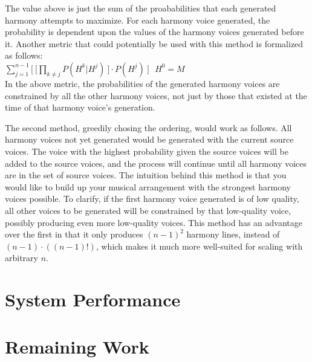 \documentclass{sig-alternate}
\begin{document}
The value above is just the sum of the proababilities that each generated harmony attempts to maximize. For each harmony voice generated, the probability is dependent upon the values of the harmony voices generated before it. Another metric that could potentially be used with this method is formalized as follows: \\

$\sum_{j = 1}^{n - 1} \lbrack\ \lbrack\prod_{k \neq j} P(H^{k} | H^{j})\ \rbrack \cdot P(H^{j})\ \rbrack\ \ \ H^{0} = M$\\

In the above metric, the probabilities of the generated harmony voices are constrained by all the other harmony voices, not just by those that existed at the time of that harmony voice's generation. 

The second method, greedily chosing the ordering, would work as follows. All harmony voices not yet generated would be generated with the current source voices. The voice with the highest probability given the source voices will be added to the source voices, and the process will continue until all harmony voices are in the set of source voices. The intuition behind this method is that you would like to build up your musical arrangement with the strongest harmony voices possible. To clarify, if the first harmony voice generated is of low quality, all other voices to be generated will be constrained by that low-quality voice, possibly producing even more low-quality voices. This method has an advantage over the first in that it only produces $(n-1)^{2}$ harmony lines, instead of $(n -1)\cdot((n-1)!)$, which makes it much more well-suited for scaling with arbitrary $n$.

\section{System Performance}
\label{sec:sys_perform}


\section{Remaining Work}
\label{sec:remaining_work}



\appendix
\label{app}
\end{document}
